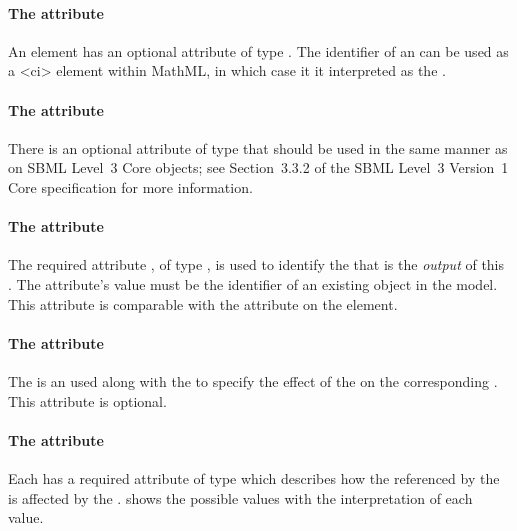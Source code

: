 \paragraph{The  attribute}
An \Output element has an optional  attribute of type .  The identifier of an \Output can be used as a 
<ci> element within MathML, in which case it it interpreted as the .

\paragraph{The  attribute}
There is an optional  attribute of type  that should be used
in the same manner as on SBML Level~3 Core
objects; see Section~3.3.2 of the SBML Level~3 Version~1 Core
specification for more information.



\paragraph{The  attribute}
The required attribute , of type , is used to identify the \QualitativeSpecies that is the \emph{output} of this \Transition.  The attribute's value must be the identifier of an existing \QualitativeSpecies object in the model.  This attribute is comparable with the  attribute on the  element.

\paragraph{The  attribute}
The  is an  used along with the  to specify the effect of the \Transition on the corresponding \QualitativeSpecies. This attribute is optional. 


\paragraph{The  attribute}
Each \Output has a required attribute  of type  which describes how the \QualitativeSpecies referenced by the \Output is affected by the \Transition.  shows the possible values with the interpretation of each value.



